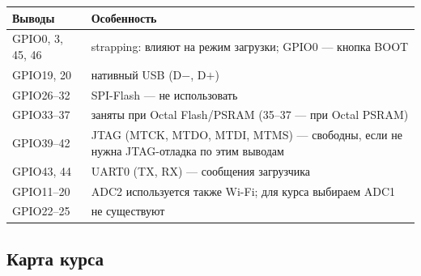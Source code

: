 \begin{center}\small
\begin{tabularx}{\textwidth}{@{}l X@{}}
\toprule
Выводы & Особенность \\
\midrule
GPIO0, 3, 45, 46 & strapping: влияют на режим загрузки; GPIO0 --- кнопка BOOT \\
GPIO19, 20 & нативный USB (D$-$, D$+$) \\
GPIO26--32 & SPI-Flash --- не использовать \\
GPIO33--37 & заняты при Octal Flash/PSRAM (35--37 --- при Octal PSRAM) \\
GPIO39--42 & JTAG (MTCK, MTDO, MTDI, MTMS) --- свободны, если не нужна JTAG-отладка по этим выводам \\
GPIO43, 44 & UART0 (TX, RX) --- сообщения загрузчика \\
GPIO11--20 & ADC2 используется также Wi-Fi; для курса выбираем ADC1 \\
GPIO22--25 & не существуют \\
\bottomrule
\end{tabularx}
\end{center}

\subsection*{Карта курса}


